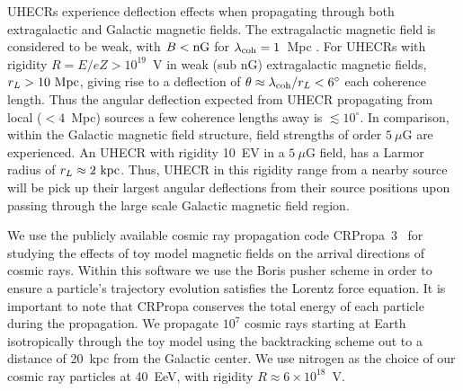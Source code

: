 \documentclass[usenatbib]{mnras}
\begin{document}
UHECRs experience deflection effects when propagating through both extragalactic and Galactic magnetic fields. The extragalactic magnetic field is considered to be weak, with $B < \rm {nG}$ for $\lambda_{\rm coh}=1$~Mpc \citep{Blasi_1999, Kronberg_2007}. For UHECRs with rigidity $R=E/eZ > 10^{19}$~V in weak (sub nG) extragalactic magnetic fields, $r_{L}>{\rm 10~Mpc}$, giving rise to a deflection of $\theta\approx \lambda_{\rm coh}/r_{L}<6^{\circ}$ each coherence length. Thus the angular deflection expected from UHECR propagating from local ($<4$~Mpc) sources a few coherence lengths away is $\lesssim 10^{\circ}$. In comparison, within the Galactic magnetic field structure, field strengths of order $5~\mu$G are experienced. An UHECR with rigidity 10~EV in a $5~\mu$G field, has a Larmor radius of $r_L \approx 2 ~ \rm kpc$. Thus, UHECR in this rigidity range from a nearby source will be pick up their largest angular deflections from their source positions upon passing through the large scale Galactic magnetic field region.

We use the publicly available cosmic ray propagation code CRPropa~3~\citep{CRPropa3_2016} for studying the effects of toy model magnetic fields on the arrival directions of cosmic rays. Within this software we use the Boris pusher scheme in order to ensure a particle's trajectory evolution satisfies the Lorentz force equation. It is important to note that CRPropa conserves the total energy of each particle during the propagation.
We propagate $10^7$ cosmic rays starting at Earth isotropically through the toy model using the backtracking scheme out to a distance of 20~kpc from the Galactic center. We use nitrogen as the choice of our cosmic ray particles at 40~EeV, with rigidity $R\approx 6 \times 10^{18}$~V. 
\end{document}
